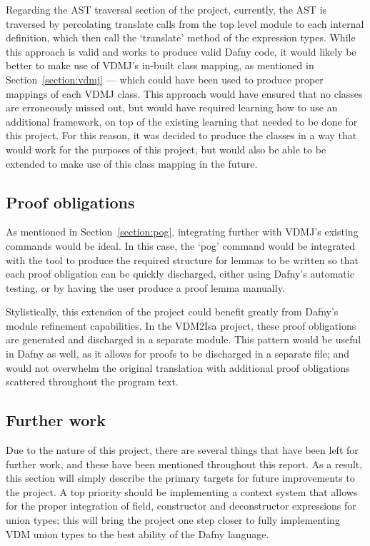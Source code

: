 \documentclass{entcs}
\begin{document}
Regarding the AST traversal section of the project, currently, the AST is traversed by percolating translate calls from the top level module to each internal definition, which then call the `translate' method of the expression types. While this approach is valid and works to produce valid Dafny code, it would likely be better to make use of VDMJ's in-built class mapping, as mentioned in Section~\ref{section:vdmj} --- which could have been used to produce proper mappings of each VDMJ class. This approach would have ensured that no classes are erroneously missed out, but would have required learning how to use an additional framework, on top of the existing learning that needed to be done for this project. For this reason, it was decided to produce the classes in a way that would work for the purposes of this project, but would also be able to be extended to make use of this class mapping in the future.

\subsection{Proof obligations}\label{section:pog_implementations}

As mentioned in Section~\ref{section:pog}, integrating further with VDMJ's existing commands would be ideal. In this case, the `pog' command would be integrated with the tool to produce the required structure for lemmas to be written so that each proof obligation can be quickly discharged, either using Dafny's automatic testing, or by having the user produce a proof lemma manually.

Stylistically, this extension of the project could benefit greatly from Dafny's module refinement capabilities. In the VDM2Isa project, these proof obligations are generated and discharged in a separate module. This pattern would be useful in Dafny as well, as it allows for proofs to be discharged in a separate file; and would not overwhelm the original translation with additional proof obligations scattered throughout the program text.

\subsection{Further work}

Due to the nature of this project, there are several things that have been left for further work, and these have been mentioned throughout this report. As a result, this section will simply describe the primary targets for future improvements to the project. A top priority should be implementing a context system that allows for the proper integration of field, constructor and deconstructor expressions for union types; this will bring the project one step closer to fully implementing VDM union types to the best ability of the Dafny language.
\end{document}
